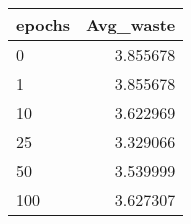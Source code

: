 \begin{tabular}{lr}
\toprule
epochs &  Avg\_waste \\
\midrule
     0 &   3.855678 \\
     1 &   3.855678 \\
    10 &   3.622969 \\
    25 &   3.329066 \\
    50 &   3.539999 \\
   100 &   3.627307 \\
\bottomrule
\end{tabular}
